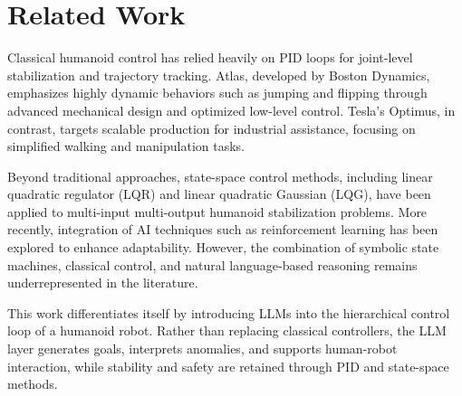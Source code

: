 \section{Related Work}
Classical humanoid control has relied heavily on PID loops
for joint-level stabilization and trajectory tracking.
Atlas, developed by Boston Dynamics, emphasizes highly dynamic behaviors
such as jumping and flipping through advanced mechanical design
and optimized low-level control.
Tesla's Optimus, in contrast, targets scalable production for industrial assistance,
focusing on simplified walking and manipulation tasks.

Beyond traditional approaches, state-space control methods,
including linear quadratic regulator (LQR) and linear quadratic Gaussian (LQG),
have been applied to multi-input multi-output humanoid stabilization problems.
More recently, integration of AI techniques such as reinforcement learning
has been explored to enhance adaptability.
However, the combination of symbolic state machines, classical control,
and natural language-based reasoning remains underrepresented in the literature.

This work differentiates itself by introducing LLMs
into the hierarchical control loop of a humanoid robot.
Rather than replacing classical controllers, the LLM layer
generates goals, interprets anomalies, and supports human-robot interaction,
while stability and safety are retained through PID and state-space methods.
